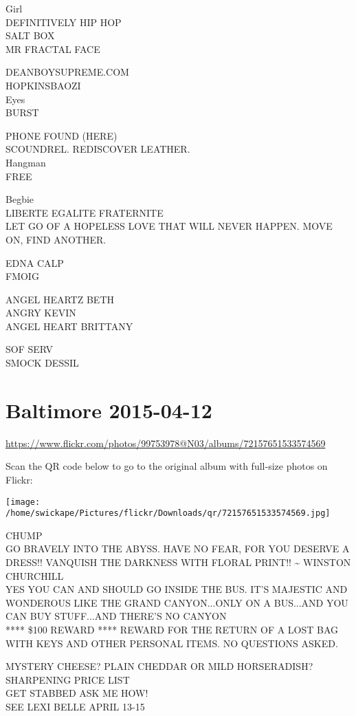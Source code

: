 \documentclass[10pt,letterpaper]{article}
\begin{document}
Girl\\
DEFINITIVELY HIP HOP\\
SALT BOX\\
MR FRACTAL FACE

DEANBOYSUPREME.COM\\
HOPKINSBAOZI\\
Eyes\\
BURST

PHONE FOUND (HERE)\\
SCOUNDREL.  REDISCOVER LEATHER.\\
Hangman\\
FREE

Begbie\\
LIBERTE EGALITE FRATERNITE\\
LET GO OF A HOPELESS LOVE THAT WILL NEVER HAPPEN.  MOVE ON, FIND ANOTHER.

EDNA CALP\\
FMOIG

ANGEL HEARTZ BETH\\
ANGRY KEVIN\\
ANGEL HEART BRITTANY

SOF SERV\\
SMOCK DESSIL
\pagebreak

\section*{Baltimore 2015-04-12}

\url{https://www.flickr.com/photos/99753978@N03/albums/72157651533574569}

Scan the QR code below to go to the original album with full-size photos on Flickr:

\texttt{[image: /home/swickape/Pictures/flickr/Downloads/qr/72157651533574569.jpg]}
\pagebreak

CHUMP\\
GO BRAVELY INTO THE ABYSS.  HAVE NO FEAR, FOR YOU DESERVE A DRESS!!  VANQUISH THE DARKNESS WITH FLORAL PRINT!!  \textasciitilde{} WINSTON CHURCHILL\\
YES YOU CAN AND SHOULD GO INSIDE THE BUS.  IT'S MAJESTIC AND WONDEROUS LIKE THE GRAND CANYON...ONLY ON A BUS...AND YOU CAN BUY STUFF...AND THERE'S NO CANYON\\
**** \$100 REWARD **** REWARD FOR THE RETURN OF A LOST BAG WITH KEYS AND OTHER PERSONAL ITEMS.  NO QUESTIONS ASKED.

MYSTERY CHEESE?  PLAIN CHEDDAR OR MILD HORSERADISH?\\
SHARPENING PRICE LIST\\
GET STABBED ASK ME HOW!\\
SEE LEXI BELLE APRIL 13{-}15
\end{document}
